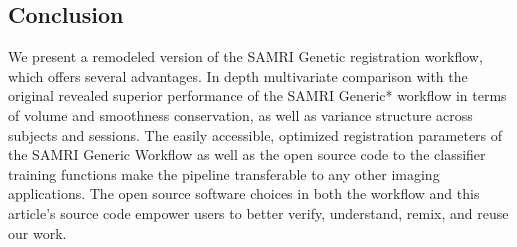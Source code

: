 \subsection{Conclusion}

We present a remodeled version of the SAMRI Genetic registration workflow, which offers several advantages.
In depth multivariate comparison with the original revealed superior performance of the SAMRI Generic* workflow in terms of volume and smoothness conservation, as well as variance structure across subjects and sessions.
The easily accessible, optimized registration parameters of the SAMRI Generic Workflow as well as the open source code to the classifier training functions make the pipeline transferable to any other imaging applications.
The open source software choices in both the workflow and this article's source code empower users to better verify, understand, remix, and reuse our work.
